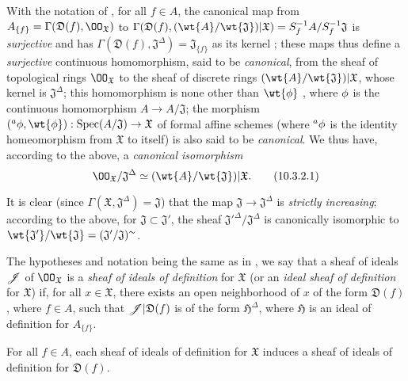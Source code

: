 \begin{env}[10.3.2]
\label{1.10.3.2}
With the notation of , for all $f\in A$, the canonical map from $A_{\{f\}}=\Gamma(\mathfrak{D}(f),\OO_\mathfrak{X})$ to $\Gamma(\mathfrak{D}(f),(\wt{A}/\wt{\mathfrak{J}})|\mathfrak{X})=S_f^{-1}A/S_f^{-1}\mathfrak{J}$ is \emph{surjective} and has $\Gamma(\mathfrak{D}(f),\mathfrak{J}^\Delta)=\mathfrak{J}_{\{f\}}$ as its kernel ; these maps thus define a \emph{surjective} continuous homomorphism, said to be \emph{canonical}, from the sheaf of topological rings $\OO_\mathfrak{X}$ to the sheaf of discrete rings $(\wt{A}/\wt{\mathfrak{J}})|\mathfrak{X}$, whose kernel is $\mathfrak{J}^\Delta$; this homomorphism is none other than $\wt{\vphi}$ , where $\phi$ is the continuous homomorphism $A\to A/\mathfrak{J}$; the morphism $({}^a\vphi,\wt{\vphi}):\Spec(A/\mathfrak{J})\to\mathfrak{X}$ of formal affine schemes (where ${}^a\phi$ is the identity homeomorphism from $\mathfrak{X}$ to itself) is also said to be \emph{canonical}.
We thus have, according to the above, a \emph{canonical isomorphism}
\[
  \OO_\mathfrak{X}/\mathfrak{J}^\Delta\isoto(\wt{A}/\wt{\mathfrak{J}})|\mathfrak{X}.
  \tag{10.3.2.1}
\]

It is clear (since $\Gamma(\mathfrak{X},\mathfrak{J}^\Delta)=\mathfrak{J}$) that the map $\mathfrak{J}\to\mathfrak{J}^\Delta$ is \emph{strictly increasing}; according to the above, for $\mathfrak{J}\subset\mathfrak{J}'$, the sheaf ${\mathfrak{J}'}^\Delta/\mathfrak{J}^\Delta$ is canonically isomorphic to $\wt{\mathfrak{J}'}/\wt{\mathfrak{J}}=(\mathfrak{J}'/\mathfrak{J})^\sim$.
\end{env}

\begin{env}[10.3.3]
\label{1.10.3.3}
The hypotheses and notation being the same as in , we say that a sheaf of ideals $\mathscr{J}$ of $\OO_\mathfrak{X}$ is a \emph{sheaf of ideals of definition} for $\mathfrak{X}$ (or an \emph{ideal sheaf of definition} for $\mathfrak{X}$) if, for all $x\in\mathfrak{X}$, there exists an open neighborhood of $x$ of the form $\mathfrak{D}(f)$, where $f\in A$, such that $\mathscr{J}|\mathfrak{D}(f)$ is of the form $\mathfrak{H}^\Delta$, where $\mathfrak{H}$ is an ideal of definition for $A_{\{f\}}$.
\end{env}

\begin{prop}[10.3.4]
\label{1.10.3.4}
For all $f\in A$, each sheaf of ideals of definition for $\mathfrak{X}$ induces a sheaf of ideals of definition for $\mathfrak{D}(f)$.
\end{prop}

